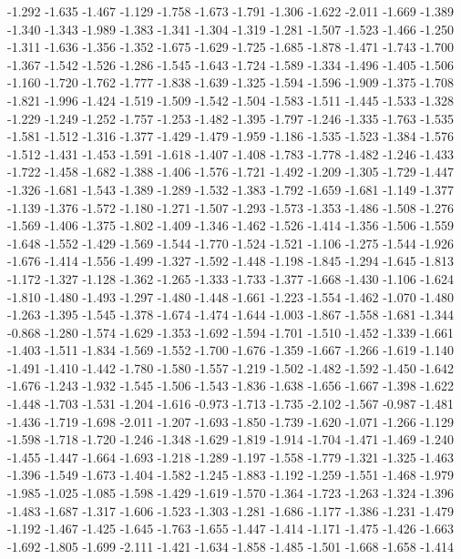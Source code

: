 \documentclass[9pt]{article}
\theoremstyle{plain}
\theoremstyle{definition}
\theoremstyle{remark}
\numberwithin{equation}{section}
\begin{document}
-1.292
-1.635
-1.467
-1.129
-1.758
-1.673
-1.791
-1.306
-1.622
-2.011
-1.669
-1.389
-1.340
-1.343
-1.989
-1.383
-1.341
-1.304
-1.319
-1.281
-1.507
-1.523
-1.466
-1.250
-1.311
-1.636
-1.356
-1.352
-1.675
-1.629
-1.725
-1.685
-1.878
-1.471
-1.743
-1.700
-1.367
-1.542
-1.526
-1.286
-1.545
-1.643
-1.724
-1.589
-1.334
-1.496
-1.405
-1.506
-1.160
-1.720
-1.762
-1.777
-1.838
-1.639
-1.325
-1.594
-1.596
-1.909
-1.375
-1.708
-1.821
-1.996
-1.424
-1.519
-1.509
-1.542
-1.504
-1.583
-1.511
-1.445
-1.533
-1.328
-1.229
-1.249
-1.252
-1.757
-1.253
-1.482
-1.395
-1.797
-1.246
-1.335
-1.763
-1.535
-1.581
-1.512
-1.316
-1.377
-1.429
-1.479
-1.959
-1.186
-1.535
-1.523
-1.384
-1.576
-1.512
-1.431
-1.453
-1.591
-1.618
-1.407
-1.408
-1.783
-1.778
-1.482
-1.246
-1.433
-1.722
-1.458
-1.682
-1.388
-1.406
-1.576
-1.721
-1.492
-1.209
-1.305
-1.729
-1.447
-1.326
-1.681
-1.543
-1.389
-1.289
-1.532
-1.383
-1.792
-1.659
-1.681
-1.149
-1.377
-1.139
-1.376
-1.572
-1.180
-1.271
-1.507
-1.293
-1.573
-1.353
-1.486
-1.508
-1.276
-1.569
-1.406
-1.375
-1.802
-1.409
-1.346
-1.462
-1.526
-1.414
-1.356
-1.506
-1.559
-1.648
-1.552
-1.429
-1.569
-1.544
-1.770
-1.524
-1.521
-1.106
-1.275
-1.544
-1.926
-1.676
-1.414
-1.556
-1.499
-1.327
-1.592
-1.448
-1.198
-1.845
-1.294
-1.645
-1.813
-1.172
-1.327
-1.128
-1.362
-1.265
-1.333
-1.733
-1.377
-1.668
-1.430
-1.106
-1.624
-1.810
-1.480
-1.493
-1.297
-1.480
-1.448
-1.661
-1.223
-1.554
-1.462
-1.070
-1.480
-1.263
-1.395
-1.545
-1.378
-1.674
-1.474
-1.644
-1.003
-1.867
-1.558
-1.681
-1.344
-0.868
-1.280
-1.574
-1.629
-1.353
-1.692
-1.594
-1.701
-1.510
-1.452
-1.339
-1.661
-1.403
-1.511
-1.834
-1.569
-1.552
-1.700
-1.676
-1.359
-1.667
-1.266
-1.619
-1.140
-1.491
-1.410
-1.442
-1.780
-1.580
-1.557
-1.219
-1.502
-1.482
-1.592
-1.450
-1.642
-1.676
-1.243
-1.932
-1.545
-1.506
-1.543
-1.836
-1.638
-1.656
-1.667
-1.398
-1.622
-1.448
-1.703
-1.531
-1.204
-1.616
-0.973
-1.713
-1.735
-2.102
-1.567
-0.987
-1.481
-1.436
-1.719
-1.698
-2.011
-1.207
-1.693
-1.850
-1.739
-1.620
-1.071
-1.266
-1.129
-1.598
-1.718
-1.720
-1.246
-1.348
-1.629
-1.819
-1.914
-1.704
-1.471
-1.469
-1.240
-1.455
-1.447
-1.664
-1.693
-1.218
-1.289
-1.197
-1.558
-1.779
-1.321
-1.325
-1.463
-1.396
-1.549
-1.673
-1.404
-1.582
-1.245
-1.883
-1.192
-1.259
-1.551
-1.468
-1.979
-1.985
-1.025
-1.085
-1.598
-1.429
-1.619
-1.570
-1.364
-1.723
-1.263
-1.324
-1.396
-1.483
-1.687
-1.317
-1.606
-1.523
-1.303
-1.281
-1.686
-1.177
-1.386
-1.231
-1.479
-1.192
-1.467
-1.425
-1.645
-1.763
-1.655
-1.447
-1.414
-1.171
-1.475
-1.426
-1.663
-1.692
-1.805
-1.699
-2.111
-1.421
-1.634
-1.858
-1.485
-1.501
-1.668
-1.658
-1.414
\end{document}
